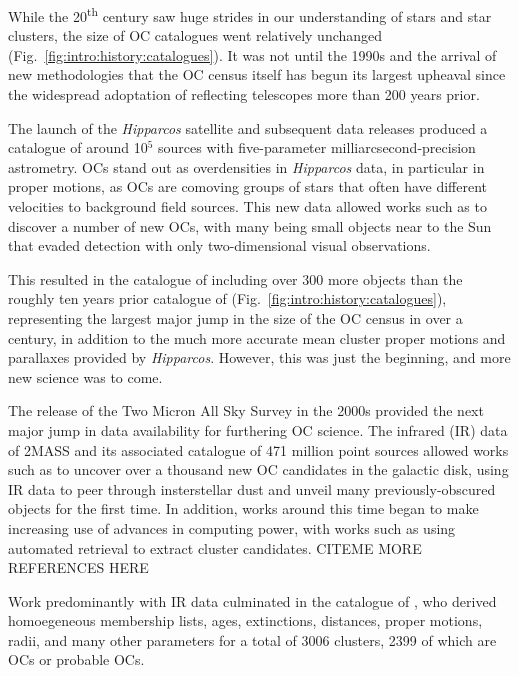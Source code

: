 While the 20\textsuperscript{th} century saw huge strides in our understanding of stars and star clusters, the size of OC catalogues went relatively unchanged (Fig.~\ref{fig:intro:history:catalogues}). It was not until the 1990s and the arrival of new methodologies that the OC census itself has begun its largest upheaval since the widespread adoptation of reflecting telescopes more than 200 years prior.

The launch of the \emph{Hipparcos} satellite and subsequent data releases \citep{perryman_hipparcos_1997} produced a catalogue of around 10$^5$ sources with five-parameter milliarcsecond-precision astrometry. OCs stand out as overdensities in \emph{Hipparcos} data, in particular in proper motions, as OCs are comoving groups of stars that often have different velocities to background field sources. This new data allowed works such as \cite{platais_search_1998} to discover a number of new OCs, with many being small objects near to the Sun that evaded detection with only two-dimensional visual observations. 

This resulted in the catalogue of \cite{dias_new_2002} including over 300 more objects than the roughly ten years prior catalogue of \cite{mermilliod_database_1995} (Fig.~\ref{fig:intro:history:catalogues}), representing the largest 
major jump in the size of the OC census in over a century, in addition to the much more accurate mean cluster proper motions and parallaxes provided by \emph{Hipparcos}. However, this was just the beginning, and more new science was to come.

The release of the Two Micron All Sky Survey \citep[2MASS,][]{skrutskie_two_2006} in the 2000s provided the next major jump in data availability for furthering OC science. The infrared (IR) data of 2MASS and its associated catalogue of 471 million point sources allowed works such as \cite{froebrich_systematic_2007} to uncover over a thousand new OC candidates in the galactic disk, using IR data to peer through insterstellar dust and unveil many previously-obscured objects for the first time. In addition, works around this time began to make increasing use of advances in computing power, with works such as \cite{froebrich_systematic_2007} using automated retrieval to extract cluster candidates. CITEME MORE REFERENCES HERE

Work predominantly with IR data culminated in the catalogue of \cite{kharchenko_global_2013}, who derived homoegeneous membership lists, ages, extinctions, distances, proper motions, radii, and many other parameters for a total of 3006 clusters, 2399 of which are OCs or probable OCs. %

